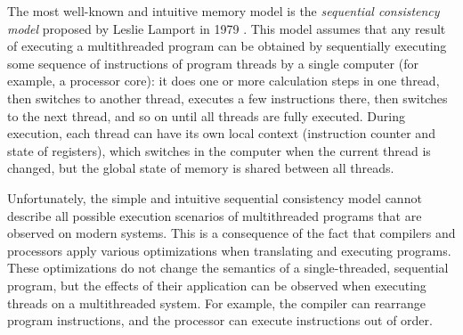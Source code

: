 The most well-known and intuitive memory model is the \emph{sequential consistency model} proposed by Leslie Lamport in 1979 \cite{Lamport:TC79}. This model assumes that any result of executing a multithreaded program can be obtained by sequentially executing some sequence of instructions of program threads by a single computer (for example, a processor core): it does one or more calculation steps in one thread, then switches to another thread, executes a few instructions there, then switches to the next thread, and so on until all threads are fully executed.
During execution, each thread can have its own local context (instruction counter and state of registers), which switches in the computer when the current thread is changed, but the global state of memory is shared between all threads.

Unfortunately, the simple and intuitive sequential consistency model cannot describe all possible execution scenarios of multithreaded programs that are observed on modern systems. This is a consequence of the fact that compilers and processors apply various optimizations when translating and executing programs. These optimizations do not change the semantics of a single-threaded, sequential program, but the effects of their application can be observed when executing threads on a multithreaded system. For example, the compiler can rearrange program instructions, and the processor can execute instructions out of order.

